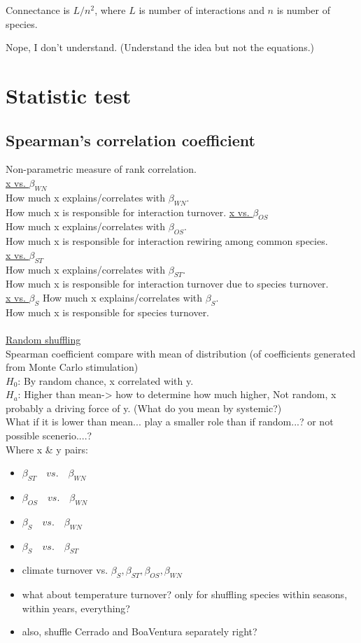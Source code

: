 \documentclass[11pt]{article}
\begin{document}
Connectance is $L/n^{2}$, where $L$ is number of interactions and $n$ is number of species.

Nope, I don't understand. (Understand the idea but not the equations.)

\section{Statistic test}

\subsection{Spearman's correlation coefficient}
Non-parametric measure of rank correlation. \\
\underline{x vs. $\beta_{WN}$} \\
How much x explains/correlates with $\beta_{WN}$. \\
How much x is responsible for interaction turnover.
\underline{x vs. $\beta_{OS}$} \\
How much x explains/correlates with $\beta_{OS}$. \\
How much x is responsible for interaction rewiring among common species. \\
\underline{x vs. $\beta_{ST}$} \\
How much x explains/correlates with $\beta_{ST}$. \\
How much x is responsible for interaction turnover due to species turnover. \\
\underline{x vs. $\beta_{S}$}
How much x explains/correlates with $\beta_{S}$. \\
How much x is responsible for species turnover. \\
\\
\underline{Random shuffling } \\
Spearman coefficient compare with mean of distribution (of coefficients generated from Monte Carlo stimulation) \\
$H_{0}$: By random chance, x correlated with y. \\
$H_{a}$: Higher than mean-> how to determine how much higher, Not random, x probably a driving force of y. (What do you mean by systemic?) \\
What if it is lower than mean... play a smaller role than if random...? or not possible scenerio....?\\
Where x \& y pairs:
\begin{itemize}
	\item $\beta_{ST}\quad vs.\quad \beta_{WN}$
	\item $\beta_{OS}\quad vs.\quad \beta_{WN}$
	\item $\beta_{S}\quad vs.\quad \beta_{WN}$
	\item $\beta_{S}\quad vs.\quad \beta_{ST}$
	\item climate turnover vs. $\beta_{S}, \beta_{ST}, \beta_{OS}, \beta_{WN}$
	\item what about temperature turnover? only for shuffling species within seasons, within years, everything?
	\item also, shuffle Cerrado and BoaVentura separately right?
\end{itemize}
\end{document}
